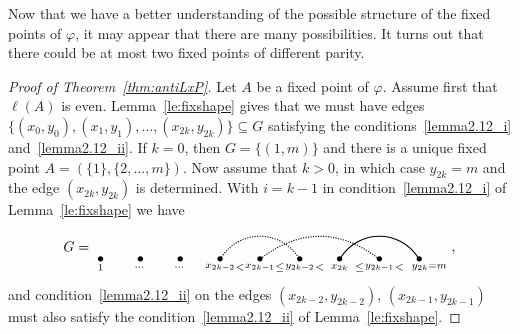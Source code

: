 \documentclass[ALCO,ThmDefs,Unicode,epreuves]{cedram}
\begin{document}
Now that we have a better understanding of the possible structure of the fixed points of $\varphi$, it may appear that there are many possibilities.
It turns out that there could be at most two fixed points of different parity. 

\begin{proof}[Proof of Theorem~\ref{thm:antiLxP}] Let $A$ be a fixed point of $\varphi$. Assume first that $\ell(A)$ is even. Lemma~\ref{le:fixshape} gives that we must have edges $\big\{(x_0,y_0),(x_1,y_1),\ldots,(x_{2k},y_{2k})\big\}\subseteq G$
satisfying the conditions~\ref{lemma2.12_i} and~\ref{lemma2.12_ii}. If $k=0$, then $G=\{(1,m)\}$ and there is a unique fixed point $A=(\{1\},\{2,\ldots,m\})$. Now assume that $k>0$, in which case $y_{2k}=m$ and the edge $(x_{2k},y_{2k})$ is determined. With $i=k-1$ in condition~\ref{lemma2.12_i} of Lemma~\ref{le:fixshape} we have
\begin{equation}\label{eq:lastarcs}
G=
\begin{tikzpicture}[baseline=.2cm]
	\foreach \x in {1,3,5,7,9,11,13,15,17} 
		\node (\x) at (\x/2,0) [inner sep=-1pt] {$\bullet$};
	\node at (1/2,-.2) {$\scriptstyle 1$};
	\node at (2/2,-.2) {$\scriptstyle $};	
	\node at (3/2,-.2) {$\scriptstyle \cdots$};
	\node at (4/2,-.2) {$\scriptstyle $};	
	\node at (5/2,-.2) {$\scriptstyle \cdots$};
	\node at (6/2,-.2) {$\scriptstyle $};	
	\node at (7/2,-.2) {$\scriptstyle x_{2k-2}$};
	\node at (8/2,-.2) {$\scriptstyle <$};	
	\node at (9/2,-.2) {$\scriptstyle x_{2k-1}$};
	\node at (10/2,-.2) {$\scriptstyle \le$};	
	\node at (11/2,-.2) {$\scriptstyle y_{2k-2}$};
	\node at (12/2,-.2) {$\scriptstyle <$};	
	\node at (13/2,-.2) {$\scriptstyle x_{2k}$};
	\node at (14/2,-.2) {$\scriptstyle \le$};	
	\node at (15/2,-.2) {$\scriptstyle y_{2k-1}$};
	\node at (16/2,-.2) {$\scriptstyle <$};	
	\node at (17.5/2,-.2) {$\scriptstyle y_{2k}=m$};
	\draw [densely dotted,thick] (7) .. controls (8/2,.75) and (10/2,.75) .. (11); 
	\draw [densely dotted,thick] (9) .. controls (11/2,.75) and (13/2,.75) .. (15); 
	\draw [thick] (13) .. controls (14/2,.75) and (16/2,.75) .. (17); 
\end{tikzpicture} ,
 \end{equation}
 and condition~\ref{lemma2.12_ii} on the edges $(x_{2k-2},y_{2k-2})$, $(x_{2k-1},y_{2k-1})$ must also satisfy the condition~\ref{lemma2.12_ii} of Lemma~\ref{le:fixshape}. 

\end{proof}
\end{document}

